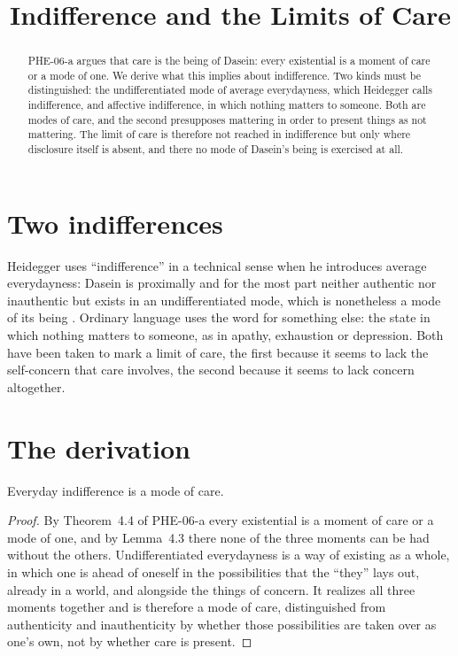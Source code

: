 \documentclass{situationist-preprint}
\title{Indifference and the Limits of Care}
\begin{document}
\maketitle

\begin{abstract}
PHE-06-a argues that care is the being of Dasein: every existential is a moment of care or a mode of one. We derive what this implies about indifference. Two kinds must be distinguished: the undifferentiated mode of average everydayness, which Heidegger calls indifference, and affective indifference, in which nothing matters to someone. Both are modes of care, and the second presupposes mattering in order to present things as not mattering. The limit of care is therefore not reached in indifference but only where disclosure itself is absent, and there no mode of Dasein's being is exercised at all.
\end{abstract}

\section{Two indifferences}

Heidegger uses \enquote{indifference} in a technical sense when he introduces average everydayness: Dasein is proximally and for the most part neither authentic nor inauthentic but exists in an undifferentiated mode, which is nonetheless a mode of its being \citep[\S9]{Heidegger1927}. Ordinary language uses the word for something else: the state in which nothing matters to someone, as in apathy, exhaustion or depression. Both have been taken to mark a limit of care, the first because it seems to lack the self-concern that care involves, the second because it seems to lack concern altogether.

\section{The derivation}

\begin{proposition}\label{p:every}
Everyday indifference is a mode of care.
\end{proposition}

\begin{proof}
By Theorem~4.4 of PHE-06-a every existential is a moment of care or a mode of one, and by Lemma~4.3 there none of the three moments can be had without the others. Undifferentiated everydayness is a way of existing as a whole, in which one is ahead of oneself in the possibilities that the \enquote{they} lays out, already in a world, and alongside the things of concern. It realizes all three moments together and is therefore a mode of care, distinguished from authenticity and inauthenticity by whether those possibilities are taken over as one's own, not by whether care is present.
\end{proof}
\end{document}
